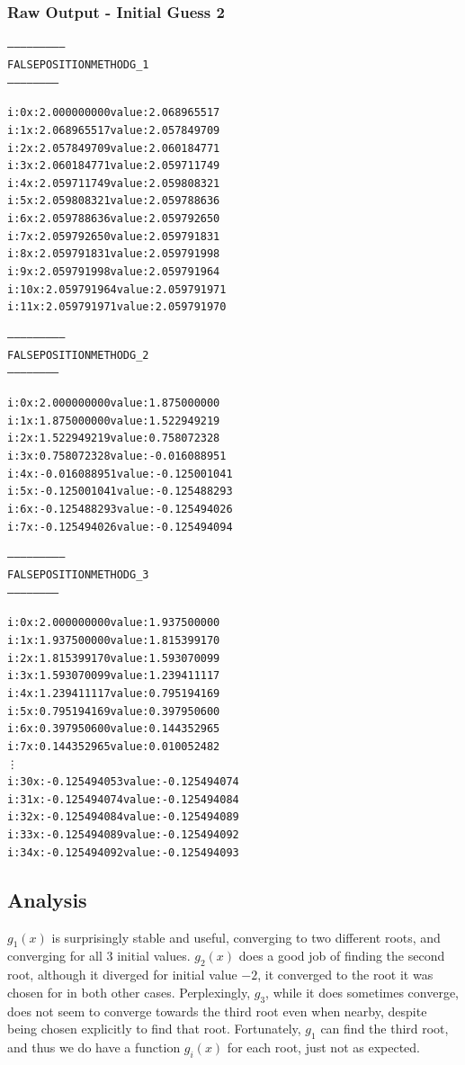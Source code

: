\documentclass[11pt]{article} %
\begin{document}
\subsubsection*{Raw Output - Initial Guess 2}
\begin{alltt}
 

--------------------------
 FALSE POSITION METHOD G_1
 -----------------------


i: 0	x: 2.000000000	value: 2.068965517
i: 1	x: 2.068965517	value: 2.057849709
i: 2	x: 2.057849709	value: 2.060184771
i: 3	x: 2.060184771	value: 2.059711749
i: 4	x: 2.059711749	value: 2.059808321
i: 5	x: 2.059808321	value: 2.059788636
i: 6	x: 2.059788636	value: 2.059792650
i: 7	x: 2.059792650	value: 2.059791831
i: 8	x: 2.059791831	value: 2.059791998
i: 9	x: 2.059791998	value: 2.059791964
i: 10	x: 2.059791964	value: 2.059791971
i: 11	x: 2.059791971	value: 2.059791970


--------------------------
 FALSE POSITION METHOD G_2
 -----------------------


i: 0	x: 2.000000000	value: 1.875000000
i: 1	x: 1.875000000	value: 1.522949219
i: 2	x: 1.522949219	value: 0.758072328
i: 3	x: 0.758072328	value: -0.016088951
i: 4	x: -0.016088951	value: -0.125001041
i: 5	x: -0.125001041	value: -0.125488293
i: 6	x: -0.125488293	value: -0.125494026
i: 7	x: -0.125494026	value: -0.125494094


--------------------------
 FALSE POSITION METHOD G_3
 -----------------------


i: 0	x: 2.000000000	value: 1.937500000
i: 1	x: 1.937500000	value: 1.815399170
i: 2	x: 1.815399170	value: 1.593070099
i: 3	x: 1.593070099	value: 1.239411117
i: 4	x: 1.239411117	value: 0.795194169
i: 5	x: 0.795194169	value: 0.397950600
i: 6	x: 0.397950600	value: 0.144352965
i: 7	x: 0.144352965	value: 0.010052482
\vdots
i: 30	x: -0.125494053	value: -0.125494074
i: 31	x: -0.125494074	value: -0.125494084
i: 32	x: -0.125494084	value: -0.125494089
i: 33	x: -0.125494089	value: -0.125494092
i: 34	x: -0.125494092	value: -0.125494093


\end{alltt}

\subsection*{Analysis}
$g_1(x)$ is surprisingly stable and useful, converging to two different roots, and converging for all 3 initial values. $g_2(x)$ does a good job of finding the second root, although it diverged for initial value $-2$, it converged to the root it was chosen for in both other cases. Perplexingly, $g_3$, while it does sometimes converge, does not seem to converge towards the third root even when nearby, despite being chosen explicitly to find that root. Fortunately, $g_1$ can find the third root, and thus we do have a function $g_i(x)$ for each root, just not as expected.
\end{document}
